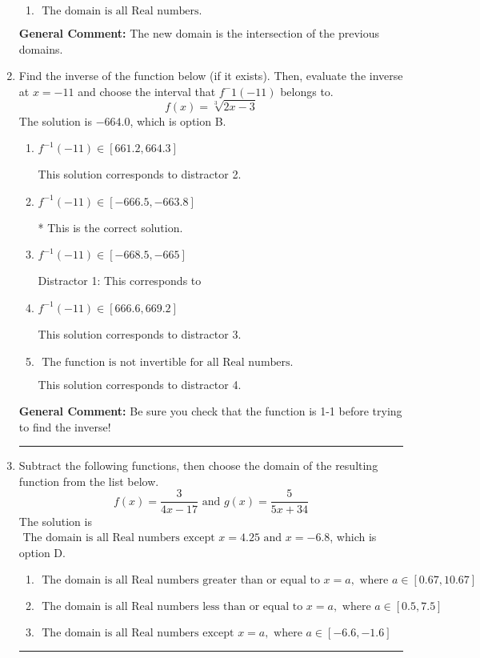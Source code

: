 \documentclass{extbook}[14pt]
\newcommand{\litem}[1]{\item #1

\rule{\textwidth}{0.4pt}}
\begin{document}
\begin{enumerate}
{\begin{enumerate}[label=\Alph*.]
\item \( \text{ The domain is all Real numbers. } \)


\end{enumerate}

\textbf{General Comment:} The new domain is the intersection of the previous domains.
}
\litem{
Find the inverse of the function below (if it exists). Then, evaluate the inverse at $x = -11$ and choose the interval that $f^-1(-11)$ belongs to.
\[ f(x) = \sqrt[3]{2 x - 3} \]The solution is \( -664.0 \), which is option B.\begin{enumerate}[label=\Alph*.]
\item \( f^{-1}(-11) \in [661.2, 664.3] \)

 This solution corresponds to distractor 2.
\item \( f^{-1}(-11) \in [-666.5, -663.8] \)

* This is the correct solution.
\item \( f^{-1}(-11) \in [-668.5, -665] \)

 Distractor 1: This corresponds to 
\item \( f^{-1}(-11) \in [666.6, 669.2] \)

 This solution corresponds to distractor 3.
\item \( \text{ The function is not invertible for all Real numbers. } \)

 This solution corresponds to distractor 4.
\end{enumerate}

\textbf{General Comment:} Be sure you check that the function is 1-1 before trying to find the inverse!
}
\litem{
Subtract the following functions, then choose the domain of the resulting function from the list below.
\[ f(x) = \frac{3}{4x-17} \text{ and } g(x) = \frac{5}{5x+34} \]The solution is \( \text{ The domain is all Real numbers except } x = 4.25 \text{ and } x = -6.8 \), which is option D.\begin{enumerate}[label=\Alph*.]
\item \( \text{ The domain is all Real numbers greater than or equal to } x = a, \text{ where } a \in [0.67, 10.67] \)


\item \( \text{ The domain is all Real numbers less than or equal to } x = a, \text{ where } a \in [0.5, 7.5] \)


\item \( \text{ The domain is all Real numbers except } x = a, \text{ where } a \in [-6.6, -1.6] \)



\end{enumerate}}
\end{enumerate}
\end{document}
